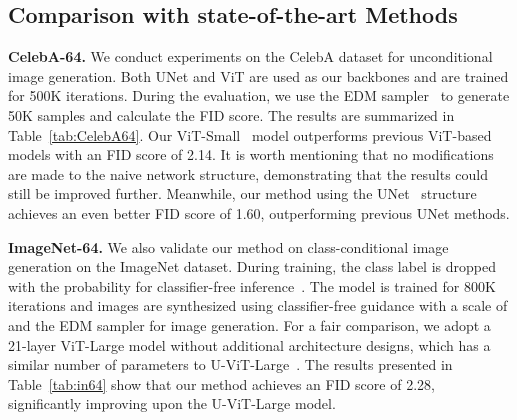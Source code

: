 \subsection{Comparison with state-of-the-art Methods}\label{sec:compare-with-sota}
\noindent\textbf{CelebA-64.}
We conduct experiments on the CelebA  dataset for unconditional image generation. Both UNet and ViT are used as our backbones and are trained for 500K iterations. During the evaluation, we use the EDM sampler~\cite{karras2022edm} to generate 50K samples and calculate the FID score. The results are summarized in Table~\ref{tab:CelebA64}. Our ViT-Small~\cite{vit} model outperforms previous ViT-based models with an FID score of 2.14. It is worth mentioning that no modifications are made to the naive network structure, demonstrating that the results could still be improved further. Meanwhile, our method using the UNet~\cite{dhariwal2021adm} structure achieves an even better FID score of 1.60, outperforming previous UNet methods.

\noindent\textbf{ImageNet-64.}
We also validate our method on class-conditional image generation on the ImageNet  dataset. 
During training, the class label is dropped with the probability  for classifier-free inference~\cite{ho2021classifierfree}. 
The model is trained for 800K iterations and images are synthesized using classifier-free guidance with a scale of  and the EDM sampler for image generation. 
For a fair comparison, we adopt a 21-layer ViT-Large model without additional architecture designs, which has a similar number of parameters to U-ViT-Large~\cite{bao2022uvit}. 
The results presented in Table~\ref{tab:in64} show that our method achieves an FID score of 2.28, significantly improving upon the U-ViT-Large model. 





